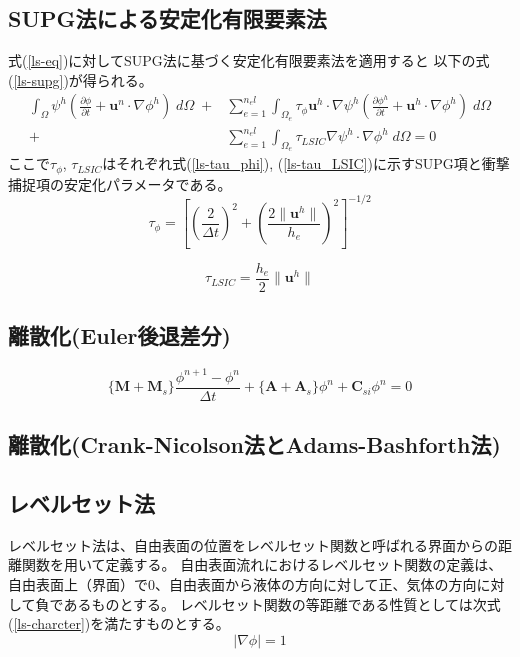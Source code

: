 \subsection{SUPG法による安定化有限要素法}
式(\ref{ls-eq})に対してSUPG法に基づく安定化有限要素法を適用すると
以下の式(\ref{ls-supg})が得られる。
\begin{equation}
\label{ls-supg}
		\begin{split}
		\int_{\Omega} \psi^{h}\left( \frac{\partial \phi}{\partial t} + \bm{u}^{n} \cdot \nabla \phi^{h} \right) \; d\Omega \;+& 
		\sum^{n_el}_{e=1} \int_{\Omega_{e}} \tau_{\phi} \bm{u}^{h} \cdot \nabla \psi^{h} \left( \frac{\partial \phi^{h}}{\partial t} + \bm{u}^{h} \cdot \nabla \phi^{h} \right) \; d\Omega \\
		+& \sum^{n_el}_{e=1} \int_{\Omega_{e}} \tau_{LSIC} \nabla \psi^{h} \cdot \nabla \phi^{h} \; d\Omega = 0
	\end{split}
\end{equation}
ここで$\tau_\phi$, $\tau_{LSIC}$はそれぞれ式(\ref{ls-tau_phi}), (\ref{ls-tau_LSIC})に示すSUPG項と衝撃捕捉項の安定化パラメータである。
\begin{equation}
\label{ls-tau_phi}
	\tau_{\phi} = \left[ \left(\frac{2}{\Delta t} \right)^2 + \left(\frac{2 \| \bm{u}^{h} \|}{h_{e}} \right)^2 \right]^{-1/2}
\end{equation}

\begin{equation}
\label{ls-tau_LSIC}
	\tau_{LSIC} = \frac{h_{e}}{2} \| \bm{u}^{h} \|
\end{equation}


\subsection{離散化(Euler後退差分)}

\begin{equation}
	\{ \bm{M} + \bm{M}_{s} \} \frac{\phi^{n+1} - \phi^{n}}{\Delta t}
	+ \{ \bm{A} + \bm{A}_{s} \} \phi^{n} 
	+ \bm{C}_{si} \phi^{n}
	= 0
\end{equation}

\subsection{離散化(Crank-Nicolson法とAdams-Bashforth法)}

\subsection{レベルセット法}
レベルセット法は、自由表面の位置をレベルセット関数と呼ばれる界面からの距離関数を用いて定義する。
自由表面流れにおけるレベルセット関数の定義は、自由表面上（界面）で0、自由表面から液体の方向に対して正、気体の方向に対して負であるものとする。
レベルセット関数の等距離である性質としては次式(\ref{ls-charcter})を満たすものとする。
\begin{equation}
\label{ls-charcter}
	| \nabla \phi | = 1
\end{equation}

